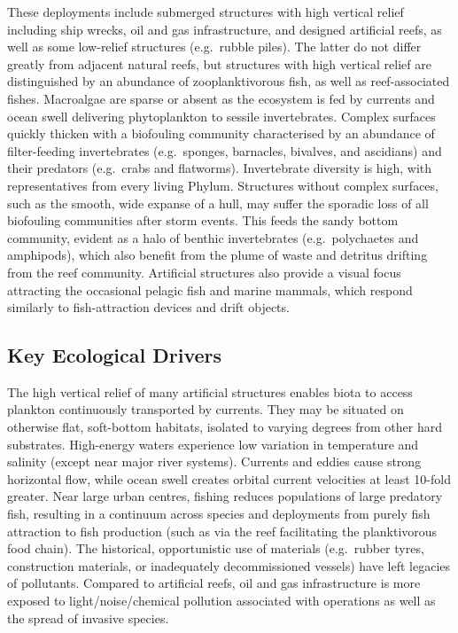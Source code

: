 \documentclass[
  letterpaper,
  DIV=11,
  numbers=noendperiod]{scrartcl}
\begin{document}
These deployments include submerged structures with high vertical relief
including ship wrecks, oil and gas infrastructure, and designed
artificial reefs, as well as some low-relief structures (e.g.~rubble
piles). The latter do not differ greatly from adjacent natural reefs,
but structures with high vertical relief are distinguished by an
abundance of zooplanktivorous fish, as well as reef-associated fishes.
Macroalgae are sparse or absent as the ecosystem is fed by currents and
ocean swell delivering phytoplankton to sessile invertebrates. Complex
surfaces quickly thicken with a biofouling community characterised by an
abundance of filter-feeding invertebrates (e.g.~sponges, barnacles,
bivalves, and ascidians) and their predators (e.g.~crabs and flatworms).
Invertebrate diversity is high, with representatives from every living
Phylum. Structures without complex surfaces, such as the smooth, wide
expanse of a hull, may suffer the sporadic loss of all biofouling
communities after storm events. This feeds the sandy bottom community,
evident as a halo of benthic invertebrates (e.g.~polychaetes and
amphipods), which also benefit from the plume of waste and detritus
drifting from the reef community. Artificial structures also provide a
visual focus attracting the occasional pelagic fish and marine mammals,
which respond similarly to fish-attraction devices and drift objects.

\subsection{Key Ecological Drivers}\label{key-ecological-drivers-47}

The high vertical relief of many artificial structures enables biota to
access plankton continuously transported by currents. They may be
situated on otherwise flat, soft-bottom habitats, isolated to varying
degrees from other hard substrates. High-energy waters experience low
variation in temperature and salinity (except near major river systems).
Currents and eddies cause strong horizontal flow, while ocean swell
creates orbital current velocities at least 10-fold greater. Near large
urban centres, fishing reduces populations of large predatory fish,
resulting in a continuum across species and deployments from purely fish
attraction to fish production (such as via the reef facilitating the
planktivorous food chain). The historical, opportunistic use of
materials (e.g.~rubber tyres, construction materials, or inadequately
decommissioned vessels) have left legacies of pollutants. Compared to
artificial reefs, oil and gas infrastructure is more exposed to
light/noise/chemical pollution associated with operations as well as the
spread of invasive species.
\end{document}
